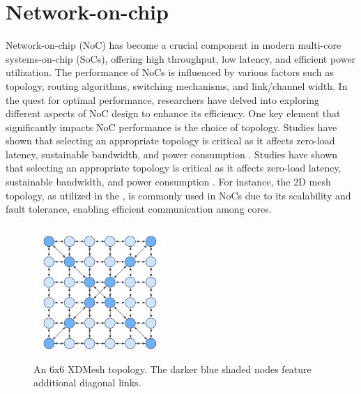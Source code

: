 \section{Network-on-chip}

Network-on-chip (NoC) has become a crucial component in modern multi-core systems-on-chip (SoCs), offering high throughput, low latency, and efficient power utilization.
The performance of NoCs is influenced by various factors such as topology, routing algorithms, switching mechanisms, and link/channel width.
In the quest for optimal performance, researchers have delved into exploring different aspects of NoC design to enhance its efficiency.
One key element that significantly impacts NoC performance is the choice of topology.
Studies have shown that selecting an appropriate topology is critical as it affects zero-load latency, sustainable bandwidth, and power consumption \cite{chenPhysicalVsVirtual2010}.
Studies have shown that selecting an appropriate topology is critical as it affects zero-load latency, sustainable bandwidth, and power consumption \cite{chen}.
For instance, the 2D mesh topology, as utilized in the \graicore{}, is commonly used in NoCs due to its scalability and fault tolerance, enabling efficient communication among cores.

\begin{figure}[htbp]
\centering
\includegraphics[width=0.45\textwidth]{assets/xdmesh_topology.pdf}
\caption{
An 6x6 XDMesh topology.
The darker blue shaded nodes feature additional diagonal links.
}
\label{fig:xdmesh_topology}
\end{figure}

